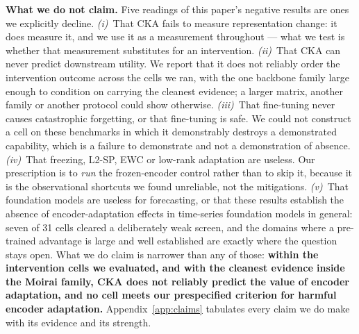 %
\textbf{What we do not claim.}  Five readings of this paper's negative results are
ones we explicitly decline.  \emph{(i)}~That CKA fails to measure representation
change: it does measure it, and we use it as a measurement throughout --- what we
test is whether that measurement substitutes for an intervention.
\emph{(ii)}~That CKA can never predict downstream utility.  We report that it does
not reliably order the intervention outcome across the cells we ran, with the one
backbone family large enough to condition on carrying the cleanest evidence; a
larger matrix, another family or another protocol could show otherwise.
\emph{(iii)}~That fine-tuning never causes catastrophic forgetting, or that
fine-tuning is safe.  We could not construct a cell on these benchmarks in which it
demonstrably destroys a demonstrated capability, which is a failure to demonstrate
and not a demonstration of absence.  \emph{(iv)}~That freezing, L2-SP, EWC or
low-rank adaptation are useless.  Our prescription is to \emph{run} the
frozen-encoder control rather than to skip it, because it is the observational
shortcuts we found unreliable, not the mitigations.  \emph{(v)}~That foundation
models are useless for forecasting, or that these results establish the absence of
encoder-adaptation effects in time-series foundation models in general: seven of 31
cells cleared a deliberately weak screen, and the domains where a pre-trained
advantage is large and well established are exactly where the question stays open.
What we do claim is narrower than any of those: \textbf{within the intervention
cells we evaluated, and with the cleanest evidence inside the Moirai family, CKA
does not reliably predict the value of encoder adaptation, and no cell meets our
prespecified criterion for harmful encoder adaptation.}
Appendix~\ref{app:claims} tabulates every claim we do make with its evidence and its
strength.


